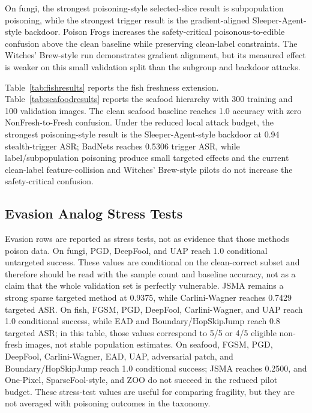\documentclass[conference]{IEEEtran}
\begin{document}

On fungi, the strongest poisoning-style selected-slice result is subpopulation poisoning, while the strongest trigger result is the gradient-aligned Sleeper-Agent-style backdoor. Poison Frogs increases the safety-critical poisonous-to-edible confusion above the clean baseline while preserving clean-label constraints. The Witches' Brew-style run demonstrates gradient alignment, but its measured effect is weaker on this small validation split than the subgroup and backdoor attacks.

Table~\ref{tab:fishresults} reports the fish freshness extension. Table~\ref{tab:seafoodresults} reports the seafood hierarchy with 300 training and 100 validation images. The clean seafood baseline reaches 1.0 accuracy with zero NonFresh-to-Fresh confusion. Under the reduced local attack budget, the strongest poisoning-style result is the Sleeper-Agent-style backdoor at 0.94 stealth-trigger ASR; BadNets reaches 0.5306 trigger ASR, while label/subpopulation poisoning produce small targeted effects and the current clean-label feature-collision and Witches' Brew-style pilots do not increase the safety-critical confusion. 

\subsection{Evasion Analog Stress Tests}

Evasion rows are reported as stress tests, not as evidence that those methods poison data. On fungi, PGD, DeepFool, and UAP reach 1.0 conditional untargeted success. These values are conditional on the clean-correct subset and therefore should be read with the sample count and baseline accuracy, not as a claim that the whole validation set is perfectly vulnerable. JSMA remains a strong sparse targeted method at 0.9375, while Carlini-Wagner reaches 0.7429 targeted ASR. On fish, FGSM, PGD, DeepFool, Carlini-Wagner, and UAP reach 1.0 conditional success, while EAD and Boundary/HopSkipJump reach 0.8 targeted ASR; in this table, those values correspond to 5/5 or 4/5 eligible non-fresh images, not stable population estimates. On seafood, FGSM, PGD, DeepFool, Carlini-Wagner, EAD, UAP, adversarial patch, and Boundary/HopSkipJump reach 1.0 conditional success; JSMA reaches 0.2500, and One-Pixel, SparseFool-style, and ZOO do not succeed in the reduced pilot budget. These stress-test values are useful for comparing fragility, but they are not averaged with poisoning outcomes in the taxonomy.
\end{document}
